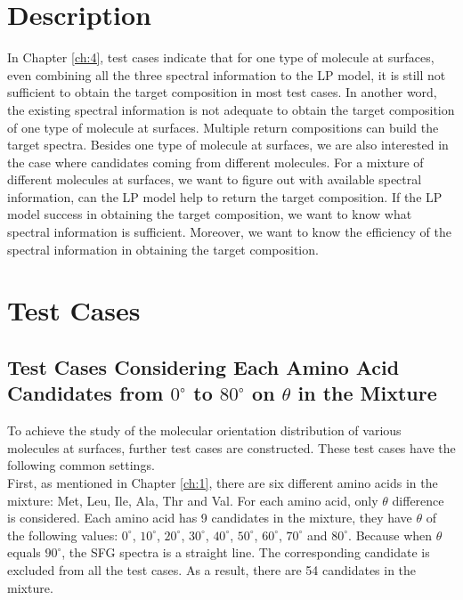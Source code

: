  \label{ch:5}
\section{Description}

In Chapter \ref{ch:4}, test cases indicate that for one type of molecule at surfaces, even combining all the three spectral information to the LP model, it is still not sufficient to obtain the target composition in most test cases. In another word, the existing spectral information is not adequate to obtain the target composition of one type of molecule at surfaces. Multiple return compositions can build the target spectra. Besides one type of molecule at surfaces, we are also interested in the case where candidates coming from different molecules. For a mixture of different molecules at surfaces, we want to figure out  with available spectral information, can the LP model help to return the target composition. If the LP model success in obtaining the target composition, we want to know what spectral information is sufficient. Moreover, we want to know the efficiency of the spectral information in obtaining the target composition. \\

\section{Test Cases}
\subsection{Test Cases Considering Each Amino Acid Candidates from $0^{\circ}$ to $80^{\circ}$ on $\theta$ in the Mixture}
To achieve the study of the molecular orientation distribution of various molecules at surfaces, further test cases are constructed. These test cases have the following common settings. \\

First, as mentioned in Chapter \ref{ch:1}, there are six different amino acids in the mixture: Met, Leu, Ile, Ala, Thr and Val. For each amino acid, only $\theta$ difference is considered. Each amino acid has 9 candidates in the mixture, they have $\theta$ of the following values: $0^{\circ}$,  $10^{\circ}$, $20^{\circ}$, $30^{\circ}$, $40^{\circ}$, $50^{\circ}$, $60^{\circ}$, $70^{\circ}$ and $80^{\circ}$. Because when $\theta$ equals $90^{\circ}$, the SFG spectra is a straight line. The corresponding candidate is excluded from all the test cases. As a result, there are 54 candidates in the mixture. \\

